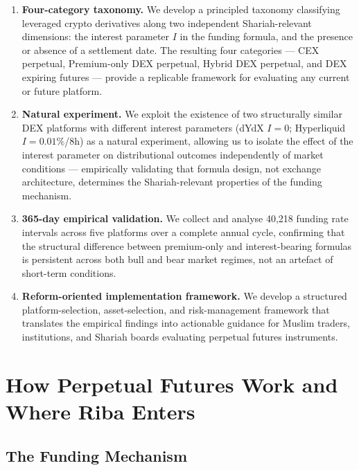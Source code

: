 \documentclass[10pt,twocolumn]{article}
\begin{document}
\begin{enumerate}[leftmargin=*, noitemsep]
\item \textbf{Four-category taxonomy.} We develop a principled taxonomy
classifying leveraged crypto derivatives along two independent Shariah-relevant
dimensions: the interest parameter $I$ in the funding formula, and the presence
or absence of a settlement date. The resulting four categories --- CEX perpetual,
Premium-only DEX perpetual, Hybrid DEX perpetual, and DEX expiring futures ---
provide a replicable framework for evaluating any current or future platform.

\item \textbf{Natural experiment.} We exploit the existence of two structurally
similar DEX platforms with different interest parameters (dYdX $I=0$;
Hyperliquid $I=0.01\%$/8h) as a natural experiment, allowing us to isolate the
effect of the interest parameter on distributional outcomes independently of
market conditions --- empirically validating that formula design, not exchange
architecture, determines the Shariah-relevant properties of the funding mechanism.

\item \textbf{365-day empirical validation.} We collect and analyse 40,218
funding rate intervals across five platforms over a complete annual cycle,
confirming that the structural difference between premium-only and
interest-bearing formulas is persistent across both bull and bear market regimes,
not an artefact of short-term conditions.

\item \textbf{Reform-oriented implementation framework.} We develop a structured
platform-selection, asset-selection, and risk-management framework that
translates the empirical findings into actionable guidance for Muslim traders,
institutions, and Shariah boards evaluating perpetual futures instruments.
\end{enumerate}

\section{How Perpetual Futures Work and Where Riba Enters}
\label{sec:mechanics}

\subsection{The Funding Mechanism}
\end{document}
